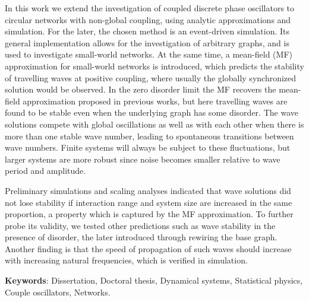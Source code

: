 In this work we extend the investigation of coupled discrete phase oscillators to circular networks with non-global coupling, using
analytic approximations and simulation. For the later, the chosen method is an event-driven simulation. Its general implementation
allows for the investigation of arbitrary graphs, and is used to investigate small-world networks. At the same time, a mean-field (MF)
approximation for small-world networks is introduced, which predicts the stability of travelling waves at positive coupling, where
usually the globally synchronized solution would be observed. In the zero disorder limit the MF recovers the mean-field approximation
proposed in previous works, but here travelling waves are found to be stable even when the underlying graph has some disorder.  The
wave solutions compete with global oscillations as well as with each other when there is more than one stable wave number, leading to
spontaneous transitions between wave numbers. Finite systems will always be subject to these fluctuations, but larger systems are more
robust since noise becomes smaller relative to wave period and amplitude.

Preliminary simulations and scaling analyses indicated that wave solutions did not lose stability if interaction range and system size
are increased in the same proportion, a property which is captured by the MF approximation. To further probe its validity, we tested
other predictions such as wave stability in the presence of disorder, the later introduced through rewiring the base graph. Another
finding is that the speed of propagation of such waves should increase with increasing natural frequencies, which is verified in
simulation.

\vspace{\onelineskip}
 
\noindent 
\textbf{Keywords}: Dissertation, Doctoral thesis, Dynamical systems, Statistical physics, Couple oscillators, Networks.
